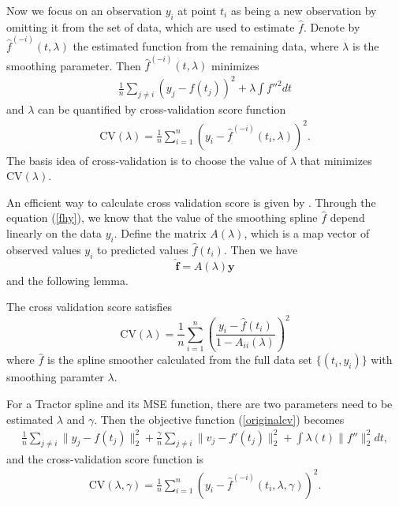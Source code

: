 Now we focus on an observation $y_i$ at point $t_i$ as being a new observation by omitting it from the set of data, which are used to estimate $\hat{f}$. Denote by $\hat{f}^{(-i)}(t,\lambda)$ the estimated function from the remaining data, where $\lambda$ is the smoothing parameter. Then $\hat{f}^{(-i)}(t,\lambda)$ minimizes 
\begin{align}\label{originalcv}
\frac{1}{n}\sum_{j \neq i}(y_j-f(t_j))^2+\lambda \int f''^2dt
\end{align}
 and $\lambda$ can be quantified by cross-validation score function
\begin{align}
\mbox{CV}(\lambda)=\frac{1}{n}\sum_{i=1}^{n}\left(  y_i-\hat{f}^{(-i)}(t_i,\lambda)\right) ^2.
\end{align}
The basis idea of cross-validation is to choose the value of $\lambda$ that minimizes $\mbox{CV}(\lambda)$. 

An efficient way to calculate cross validation score is given by \cite{green1993nonparametric}. Through the equation (\ref{fhy}), we know that the value of the smoothing spline $\hat{f}$ depend linearly on the data $y_i$. Define the matrix $A(\lambda)$, which is a map vector of observed values $y_i$ to predicted values $\hat{f}(t_i)$. Then we have
\begin{equation}\label{crossvalidationmatrixA}
\hat{\mathbf{f}}=A(\lambda)\mathbf{y}
\end{equation}
and the following lemma.
\begin{lemma}\label{cvlema}
The cross validation score satisfies
\begin{equation}
\mbox{CV}(\lambda)=\frac{1}{n} \sum_{i=1}^n \left(\frac{y_i-\hat{f}(t_i)}{1-A_{ii}(\lambda)}\right)^2
\end{equation}
where $\hat{f}$ is the spline smoother calculated from the full data set $\{(t_i,y_i)\}$ with smoothing paramter $\lambda$.
\end{lemma}

For a Tractor spline and its MSE function, there are two parameters need to be estimated $\lambda$ and $\gamma$. Then the objective function (\ref{originalcv}) becomes
\begin{align}
\frac{1}{n}\sum_{j \neq i}\lVert y_j-f(t_j) \rVert_2^2+\frac{\gamma}{n}\sum_{j \neq i} \lVert v_j-f'(t_j) \rVert_2^2+ \int \lambda(t) \lVert f''\rVert_2^2dt,
\end{align}
and the cross-validation score function is
\begin{align}
\mbox{CV}(\lambda,\gamma)=\frac{1}{n}\sum_{i=1}^{n}\left( y_i-\hat{f}^{(-i)}(t_i,\lambda,\gamma) \right) ^2.
\end{align}

